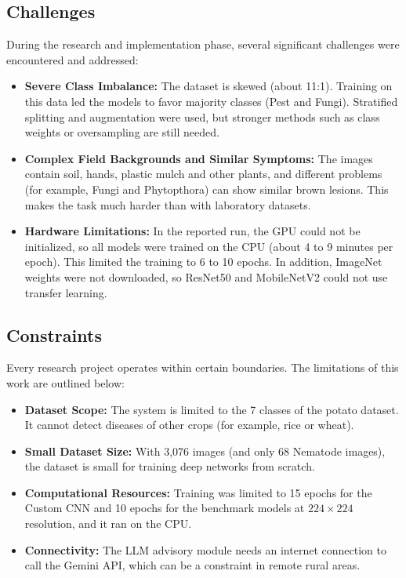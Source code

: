 \subsection{Challenges}
During the research and implementation phase, several significant challenges were encountered and addressed:
\begin{itemize}
    \item \textbf{Severe Class Imbalance:} The dataset is skewed (about 11:1). Training on this data led the models to favor majority classes (Pest and Fungi). Stratified splitting and augmentation were used, but stronger methods such as class weights or oversampling are still needed.
    \item \textbf{Complex Field Backgrounds and Similar Symptoms:} The images contain soil, hands, plastic mulch and other plants, and different problems (for example, Fungi and Phytopthora) can show similar brown lesions. This makes the task much harder than with laboratory datasets.
    \item \textbf{Hardware Limitations:} In the reported run, the GPU could not be initialized, so all models were trained on the CPU (about 4 to 9 minutes per epoch). This limited the training to 6 to 10 epochs. In addition, ImageNet weights were not downloaded, so ResNet50 and MobileNetV2 could not use transfer learning.
\end{itemize}

\subsection{Constraints}
Every research project operates within certain boundaries. The limitations of this work are outlined below:
\begin{itemize}
    \item \textbf{Dataset Scope:} The system is limited to the 7 classes of the potato dataset. It cannot detect diseases of other crops (for example, rice or wheat).
    \item \textbf{Small Dataset Size:} With 3,076 images (and only 68 Nematode images), the dataset is small for training deep networks from scratch.
    \item \textbf{Computational Resources:} Training was limited to 15 epochs for the Custom CNN and 10 epochs for the benchmark models at $224 \times 224$ resolution, and it ran on the CPU.
    \item \textbf{Connectivity:} The LLM advisory module needs an internet connection to call the Gemini API, which can be a constraint in remote rural areas.
\end{itemize}

